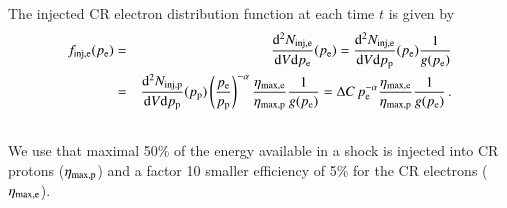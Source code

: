 \documentclass[useAMS,usenatbib]{mn2e}
\newcommand{\dd}{\mathrm{d}}
\newcommand{\p}{\mathrm{p}}
\newcommand{\e}{\mathrm{e}}
\begin{document}
The injected CR electron distribution function at each time $t$ is
given by
\begin{eqnarray}
  \label{eq:f_inj_e}
  f_\rmn{inj,e}(p_\e) &=&  \frac{\dd^2 N_\rmn{inj,e}}{\dd V \dd p_\e}(p_\e) = 
\frac{\dd^2 N_\rmn{inj,e}}{\dd V \dd p_\p}(p_\e)\frac{1}{g(p_\e)} \nonumber\\
&=& \frac{\dd^2 N_\rmn{inj,p}}{\dd V \dd p_\p}(p_\p)
\left(\frac{p_\e}{p_\p}\right)^{-\alpha}\frac{\eta_\rmn{max,e}}{\eta_\rmn{max,p}}\frac{1}{g(p_\e)} = 
\Delta C\,p_\e^{-\alpha}\frac{\eta_\rmn{max,e}}{\eta_\rmn{max,p}}\frac{1}{g(p_\e)}\,.
 \nonumber\\
&&
\end{eqnarray}
We use that maximal 50\% of the energy available in a shock is
injected into CR protons ($\eta_{\mathrm{max,p}}$) and a factor 10 smaller
efficiency of 5\% for the CR electrons ($\eta_{\mathrm{max,e}}$).
\end{document}
